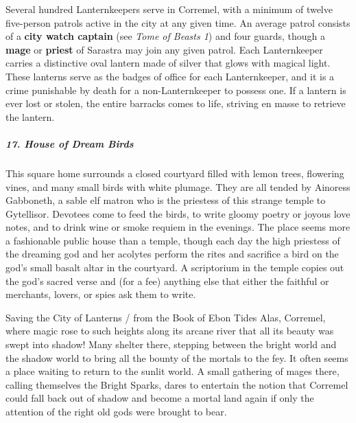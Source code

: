 \documentclass[10pt,a4paper,twoside,bg=print,twocolumn,openany,nodeprecatedcode]{dndbook}
\begin{document}
Several hundred Lanternkeepers serve in Corremel, with a minimum of twelve five-person patrols active in the city at any given time. An average patrol consists of a \textbf{city watch captain} (see \textit{Tome of Beasts 1}) and four guards, though a \textbf{mage} or \textbf{priest} of Sarastra may join any given patrol. Each Lanternkeeper carries a distinctive oval lantern made of silver that glows with magical light. These lanterns serve as the badges of office for each Lanternkeeper, and it is a crime punishable by death for a non-Lanternkeeper to possess one. If a lantern is ever lost or stolen, the entire barracks comes to life, striving en masse to retrieve the lantern.

\subparagraph{17. House of Dream Birds}
This square home surrounds a closed courtyard filled with lemon trees, flowering vines, and many small birds with white plumage. They are all tended by Ainoress Gabboneth, a sable elf matron who is the priestess of this strange temple to Gytellisor. Devotees come to feed the birds, to write gloomy poetry or joyous love notes, and to drink wine or smoke requiem in the evenings. The place seems more a fashionable public house than a temple, though each day the high priestess of the dreaming god and her acolytes perform the rites and sacrifice a bird on the god's small basalt altar in the courtyard. A scriptorium in the temple copies out the god's sacred verse and (for a fee) anything else that either the faithful or merchants, lovers, or spies ask them to write.

\begin{DndSidebar}[float=!b]{Saving the City of Lanterns / from the Book of Ebon Tides}
Alas, Corremel, where magic rose to such heights along its arcane river that all its beauty was swept into shadow! Many shelter there, stepping between the bright world and the shadow world to bring all the bounty of the mortals to the fey. It often seems a place waiting to return to the sunlit world. A small gathering of mages there, calling themselves the Bright Sparks, dares to entertain the notion that Corremel could fall back out of shadow and become a mortal land again if only the attention of the right old gods were brought to bear.



\end{DndSidebar}
\end{document}
